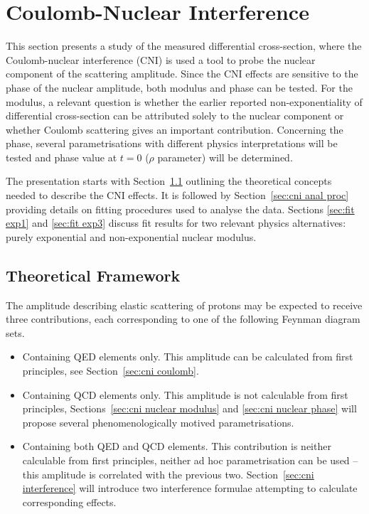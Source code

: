 \section{Coulomb-Nuclear Interference}
\label{sec:coulomb}

This section presents a study of the measured differential cross-section, where the Coulomb-nuclear interference (CNI) is used a tool to probe the nuclear component of the scattering amplitude. Since the CNI effects are sensitive to the phase of the nuclear amplitude, both modulus and phase can be tested. For the modulus, a relevant question is whether the earlier reported non-exponentiality of differential cross-section \cite{8tev-90m} can be attributed solely to the nuclear component or whether Coulomb scattering gives an important contribution. Concerning the phase, several parametrisations with different physics interpretations will be tested and phase value at $t = 0$ ($\rho$ parameter) will be determined.

The presentation starts with Section~\ref{sec:cni framework} outlining the theoretical concepts needed to describe the CNI effects. It is followed by Section~\ref{sec:cni anal proc} providing details on fitting procedures used to analyse the data. Sections \ref{sec:fit exp1} and \ref{sec:fit exp3} discuss fit results for two relevant physics alternatives: purely exponential and non-exponential nuclear modulus.




\subsection{Theoretical Framework}
\label{sec:cni framework}

The amplitude describing elastic scattering of protons may be expected to receive three contributions, each corresponding to one of the following Feynman diagram sets.
\begin{itemize}
\item Containing QED elements only. This amplitude can be calculated from first principles, see Section~\ref{sec:cni coulomb}.
\item Containing QCD elements only. This amplitude is not calculable from first principles, Sections~\ref{sec:cni nuclear modulus} and \ref{sec:cni nuclear phase} will propose several phenomenologically motived parametrisations.
\item Containing both QED and QCD elements. This contribution is neither calculable from first principles, neither ad hoc parametrisation can be used -- this amplitude is correlated with the previous two. Section~\ref{sec:cni interference} will introduce two interference formulae attempting to calculate corresponding effects.
\end{itemize}


